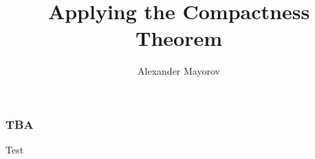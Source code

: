 \documentclass{beamer}
\title{Applying the Compactness Theorem}
\author{Alexander Mayorov}
\institute{TU Kaiserslautern}
\begin{document}
	
	\frame{\titlepage}
	
	\begin{frame}
		\frametitle{TBA}
		Test
	\end{frame}
	
\end{document}
